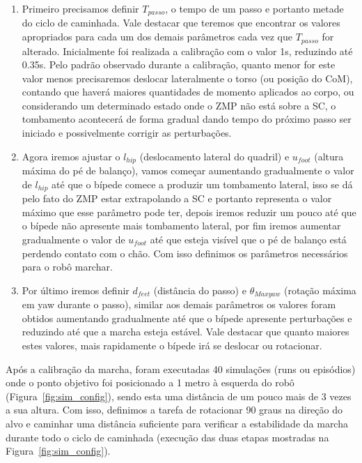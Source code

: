 \begin{enumerate}
    \item Primeiro precisamos definir $T_{passo}$, o tempo de um passo e portanto metade do ciclo de caminhada. Vale destacar que teremos que encontrar os valores apropriados para cada um dos demais parâmetros cada vez que $T_{passo}$ for alterado. Inicialmente foi realizada a calibração com o valor 1s, reduzindo até 0.35s. Pelo padrão observado durante a calibração, quanto menor for este valor menos precisaremos deslocar lateralmente o torso (ou posição do CoM), contando que haverá maiores quantidades de momento aplicados ao corpo, ou considerando um determinado estado onde o ZMP não está sobre a SC, o tombamento acontecerá de forma gradual dando tempo do próximo passo ser iniciado e possivelmente corrigir as perturbações.
    
    \item Agora iremos ajustar o $l_{hip}$ (deslocamento lateral do quadril) e $u_{foot}$ (altura máxima do pé de balanço), vamos começar aumentando gradualmente o valor de $l_{hip}$ até que o bípede comece a produzir um tombamento lateral, isso se dá pelo fato do ZMP estar extrapolando a SC e portanto representa o valor máximo que esse parâmetro pode ter, depois iremos reduzir um pouco até que o bípede não apresente mais tombamento lateral, por fim iremos aumentar gradualmente o valor de $u_{foot}$ até que esteja visível que o pé de balanço está perdendo contato com o chão. Com isso definimos os parâmetros necessários para o robô marchar.
    
    \item Por último iremos definir $d_{feet}$ (distância do passo) e $\theta_{Maxyaw}$ (rotação máxima em yaw durante o passo), similar aos demais parâmetros os valores foram obtidos aumentando gradualmente até que o bípede apresente perturbações e reduzindo até que a marcha esteja estável. Vale destacar que quanto maiores estes valores, mais rapidamente o bípede irá se deslocar ou rotacionar.
\end{enumerate}

Após a calibração da marcha, foram executadas 40 simulações (runs ou episódios)  onde o ponto objetivo foi posicionado a 1 metro à esquerda do robô (Figura~\ref{fig:sim_config}), sendo esta uma distância de um pouco mais de 3 vezes a sua altura. Com isso, definimos a tarefa de rotacionar 90 graus na direção do alvo e caminhar uma distância suficiente para verificar a estabilidade da marcha durante todo o ciclo de caminhada (execução das duas etapas mostradas na Figura~\ref{fig:sim_config}).

